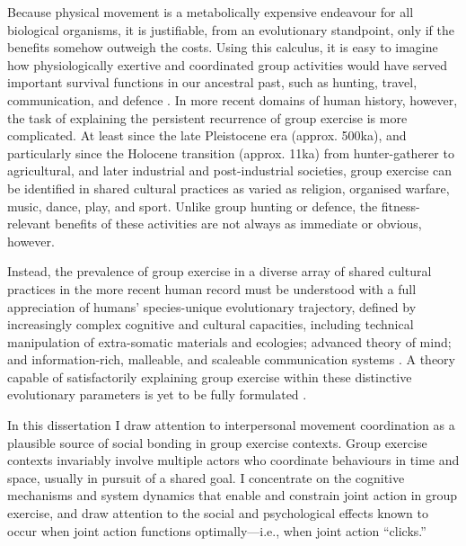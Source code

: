 \begin{CJK}{UTF8}{gbsn}

Because physical movement is a metabolically expensive endeavour for all biological organisms, it is justifiable, from an evolutionary standpoint, only if the benefits somehow outweigh the costs.  Using this calculus, it is easy to imagine how physiologically exertive and coordinated group activities would have served important survival functions in our ancestral past, such as hunting, travel, communication, and defence \citep{Sands2010}.  In more recent domains of human history, however, the task of explaining the persistent recurrence of group exercise is more complicated.  At least since the late Pleistocene era (approx. 500ka), and particularly since the Holocene transition (approx. 11ka) from hunter-gatherer to agricultural, and later industrial and post-industrial societies, group exercise can be identified in shared cultural practices as varied as religion, organised warfare, music, dance, play, and sport.  Unlike group hunting or defence, the fitness-relevant benefits of these activities are not always as immediate or obvious, however.

Instead, the prevalence of group exercise in a diverse array of shared cultural practices in the more recent human record must be understood with a full appreciation of humans' species-unique evolutionary trajectory, defined by increasingly complex cognitive and cultural capacities, including technical manipulation of extra-somatic materials and ecologies; advanced theory of mind; and information-rich, malleable, and scaleable communication systems \citep{Fuentes2016}.  A theory capable of satisfactorily explaining group exercise within these distinctive evolutionary parameters is yet to be fully formulated \citep{Cohen2017}.

In this dissertation I draw attention to interpersonal movement coordination as a plausible source of social bonding in group exercise contexts.  Group exercise contexts invariably involve multiple actors who coordinate behaviours in time and space, usually in pursuit of a shared goal.  I concentrate on the cognitive mechanisms and system dynamics that enable and constrain joint action in group exercise, and draw attention to the social and psychological effects known to occur when joint action functions optimally---i.e., when joint action ``clicks.''


\end{CJK}
